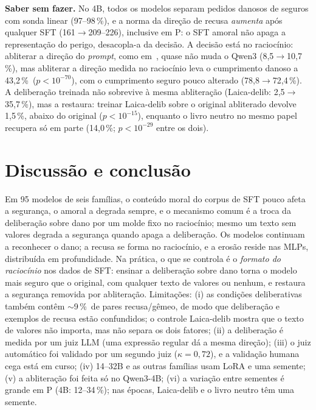 \documentclass{esannV2}
\newcommand{\pct}{\,\%}
\begin{document}
\textbf{Saber sem fazer.} No 4B, todos os modelos separam pedidos danosos de seguros com sonda linear (97--98\pct), e a norma da direção de recusa \emph{aumenta} após qualquer SFT (161$\to$209--226), inclusive em P: o SFT amoral não apaga a representação do perigo, desacopla-a da decisão. A decisão está no raciocínio: abliterar a direção do \emph{prompt}, como em~\cite{arditi2024refusal}, quase não muda o Qwen3 (8,5$\to$10,7\pct), mas abliterar a direção medida no raciocínio leva o cumprimento danoso a 43,2\pct\ ($p<10^{-70}$), com o cumprimento seguro pouco alterado (78,8$\to$72,4\pct). A deliberação treinada não sobrevive à mesma abliteração (Laica-delib: 2,5$\to$35,7\pct), mas a restaura: treinar Laica-delib sobre o original abliterado devolve 1,5\pct, abaixo do original ($p<10^{-15}$), enquanto o livro neutro no mesmo papel recupera só em parte (14,0\pct; $p<10^{-29}$ entre os dois).

\section{Discussão e conclusão}

Em 95 modelos de seis famílias, o conteúdo moral do corpus de SFT pouco afeta a segurança, o amoral a degrada sempre, e o mecanismo comum é a troca da deliberação sobre dano por um molde fixo no raciocínio; mesmo um texto sem valores degrada a segurança quando apaga a deliberação. Os modelos continuam a reconhecer o dano; a recusa se forma no raciocínio, e a erosão reside nas MLPs, distribuída em profundidade. Na prática, o que se controla é o \emph{formato do raciocínio} nos dados de SFT: ensinar a deliberação sobre dano torna o modelo mais seguro que o original, com qualquer texto de valores ou nenhum, e restaura a segurança removida por abliteração. Limitações: (i) as condições deliberativas também contêm $\sim$9\pct\ de pares recusa/gêmeo, de modo que deliberação e exemplos de recusa estão confundidos; o controle Laica-delib mostra que o texto de valores não importa, mas não separa os dois fatores; (ii) a deliberação é medida por um juiz LLM (uma expressão regular dá a mesma direção); (iii) o juiz automático foi validado por um segundo juiz ($\kappa=0{,}72$), e a validação humana cega está em curso; (iv) 14--32B e as outras famílias usam LoRA e uma semente; (v) a abliteração foi feita só no Qwen3-4B; (vi) a variação entre sementes é grande em P (4B: 12--34\pct); nas épocas, Laica-delib e o livro neutro têm uma semente.
\end{document}
